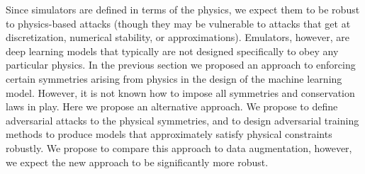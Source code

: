 \documentclass[10pt]{article}
\begin{document}
Since simulators are defined in terms of the physics, we expect them to be robust to physics-based attacks (though they may be vulnerable to attacks that get at discretization, numerical stability, or approximations).
Emulators, however, are deep learning models that typically are not designed specifically to obey any particular physics.
In the previous section we proposed an approach to enforcing certain symmetries arising from physics in the design of the machine learning model.
However, it is not known how to impose all symmetries and conservation laws in play. Here we propose an alternative approach. We propose to define adversarial attacks to the physical symmetries, and to design adversarial training methods to produce models that approximately satisfy physical constraints robustly.
We propose to compare this approach to data augmentation, however, we expect the new approach to be significantly more robust.



\end{document}
